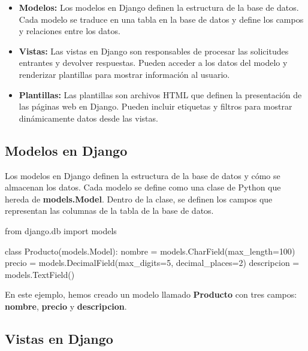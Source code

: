 \documentclass[
  a4paper,
  DIV=11,
  numbers=noendperiod,
  onepage,
  openany]{scrreprt}
\newenvironment{Shaded}{\begin{snugshade}}{\end{snugshade}}
\newcommand{\DecValTok}[1]{\textcolor[rgb]{0.68,0.00,0.00}{#1}}
\newcommand{\ImportTok}[1]{\textcolor[rgb]{0.00,0.46,0.62}{#1}}
\newcommand{\KeywordTok}[1]{\textcolor[rgb]{0.00,0.23,0.31}{#1}}
\newcommand{\NormalTok}[1]{\textcolor[rgb]{0.00,0.23,0.31}{#1}}
\newcommand{\OperatorTok}[1]{\textcolor[rgb]{0.37,0.37,0.37}{#1}}
\begin{document}
\begin{itemize}
\item
  \textbf{Modelos:} Los modelos en Django definen la estructura de la
  base de datos. Cada modelo se traduce en una tabla en la base de datos
  y define los campos y relaciones entre los datos.
\item
  \textbf{Vistas:} Las vistas en Django son responsables de procesar las
  solicitudes entrantes y devolver respuestas. Pueden acceder a los
  datos del modelo y renderizar plantillas para mostrar información al
  usuario.
\item
  \textbf{Plantillas:} Las plantillas son archivos HTML que definen la
  presentación de las páginas web en Django. Pueden incluir etiquetas y
  filtros para mostrar dinámicamente datos desde las vistas.
\end{itemize}

\subsection{Modelos en Django}\label{modelos-en-django}

Los modelos en Django definen la estructura de la base de datos y cómo
se almacenan los datos. Cada modelo se define como una clase de Python
que hereda de \textbf{models.Model}. Dentro de la clase, se definen los
campos que representan las columnas de la tabla de la base de datos.

\begin{Shaded}
\begin{Highlighting}[]
\ImportTok{from}\NormalTok{ django.db }\ImportTok{import}\NormalTok{ models}

\KeywordTok{class}\NormalTok{ Producto(models.Model):}
\NormalTok{    nombre }\OperatorTok{=}\NormalTok{ models.CharField(max\_length}\OperatorTok{=}\DecValTok{100}\NormalTok{)}
\NormalTok{    precio }\OperatorTok{=}\NormalTok{ models.DecimalField(max\_digits}\OperatorTok{=}\DecValTok{5}\NormalTok{, decimal\_places}\OperatorTok{=}\DecValTok{2}\NormalTok{)}
\NormalTok{    descripcion }\OperatorTok{=}\NormalTok{ models.TextField()}
\end{Highlighting}
\end{Shaded}

En este ejemplo, hemos creado un modelo llamado \textbf{Producto} con
tres campos: \textbf{nombre}, \textbf{precio} y \textbf{descripcion}.

\subsection{Vistas en Django}\label{vistas-en-django}
\end{document}
